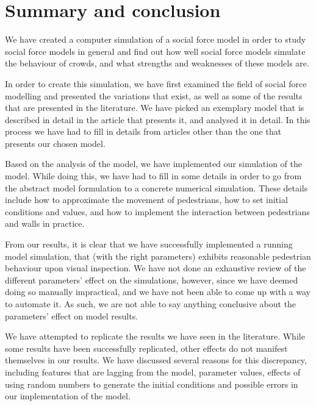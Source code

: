\section{Summary and conclusion}
\label{sec:conclusion}

We have created a computer simulation of a social force model in order to 
study social force models in general and find out how well social force models 
simulate the behaviour of crowds, and what strengths and weaknesses of these 
models are.

In order to create this simulation, we have first examined the field of social 
force modelling and presented the variations that exist, as well as some of 
the results that are presented in the literature. We have picked an exemplary 
model that is described in detail in the article that presents it, and 
analysed it in detail. In this process we have had to fill in details from 
articles other than the one that presents our chosen model.

Based on the analysis of the model, we have implemented our simulation of the 
model. While doing this, we have had to fill in some details in order to go 
from the abstract model formulation to a concrete numerical simulation. These 
details include how to approximate the movement of pedestrians, how to set 
initial conditions and values, and how to implement the interaction between 
pedestrians and walls in practice.

From our results, it is clear that we have successfully implemented a running 
model simulation, that (with the right parameters) exhibits reasonable 
pedestrian behaviour upon visual inspection. We have not done an exhaustive 
review of the different parameters' effect on the simulations, however, since 
we have deemed doing so manually impractical, and we have not been able to 
come up with a way to automate it. As such, we are not able to say anything 
conclusive about the parameters' effect on model results.

We have attempted to replicate the results we have seen in the literature.  
While some results have been successfully replicated, other effects do not 
manifest themselves in our results. We have discussed several reasons for this 
discrepancy, including features that are lagging from the model, parameter 
values, effects of using random numbers to generate the initial conditions and 
possible errors in our implementation of the model.

